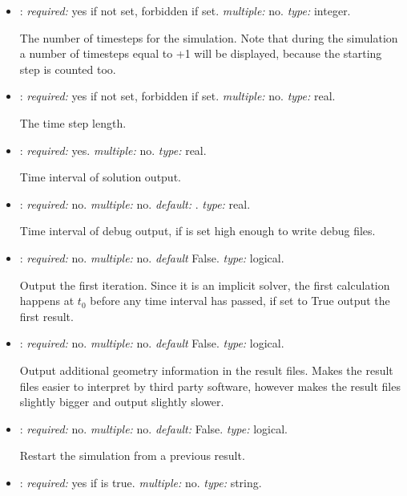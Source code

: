 \begin{itemize}
The end time of the simulation.

\item {}: \textit{required:} yes if  not set, forbidden if set. 
\textit{multiple:} no. \textit{type:} integer.

The number of timesteps for the simulation. Note that during the simulation a number 
of timesteps equal to +1 will be displayed, because the starting step 
is counted too. 

\item {}: \textit{required:} yes if  not set, forbidden if set. 
\textit{multiple:} no. \textit{type:} real.

The time step length.

\item {}: \textit{required:} yes. \textit{multiple:} no. \textit{type:} real.

Time interval of solution output.

\item {}: \textit{required:} no. \textit{multiple:} no. \textit{default:} 
. \textit{type:} real.

Time interval of debug output, if  is set high enough to write debug 
files.


\item {}: \textit{required:} no. \textit{multiple:} no. 
\textit{default} False. \textit{type:} logical.

Output the first iteration. Since it is an implicit solver, the first calculation happens 
at $t_0$ before any time interval has passed, if set to True output the first result.

\item {}: \textit{required:} no. \textit{multiple:} no. 
\textit{default} False. \textit{type:} logical.

Output additional geometry information in the result files. Makes the result files 
easier to interpret by third party software, however makes the result files slightly 
bigger and output slightly slower.

\item {}: \textit{required:} no. \textit{multiple:} no. 
\textit{default:} False. \textit{type:} logical.

Restart the simulation from a previous result.


\item {}: \textit{required:} yes if  
is true. \textit{multiple:} no. \textit{type:} string.


\end{itemize}
